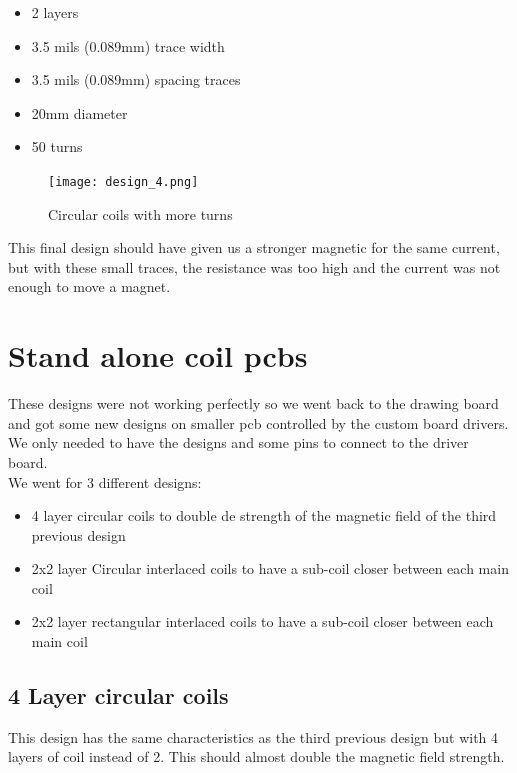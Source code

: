 \begin{itemize}
	\item 2 layers
	\item 3.5 mils (0.089mm) trace width
	\item 3.5 mils (0.089mm) spacing traces
	\item 20mm diameter
	\item 50 turns
\end{itemize}

\begin{figure}[H]
	\centering
	\texttt{[image: design\_4.png]}
	\caption[Circular coils with more turns]{Circular coils with more turns}
	\label{fig:circular_more_turns}
\end{figure}

This final design should have given us a stronger magnetic for the same current, but with these small traces, the resistance was too high and the current was not enough to move a magnet.

\newpage


\section{Stand alone coil \gls{pcb}s}

These designs were not working perfectly so we went back to the drawing board and got some new designs on smaller \gls{pcb} controlled by the custom board drivers. We only needed to have the designs and some pins to connect to the driver board.
\\

We went for 3 different designs:
\begin{itemize}
	\item 4 layer circular coils to double de strength of the magnetic field of the third previous design
	\item 2x2 layer Circular interlaced coils to have a sub-coil closer between each main coil
	\item 2x2 layer rectangular interlaced coils to have a sub-coil closer between each main coil
\end{itemize}

\subsection{4 Layer circular coils}

This design has the same characteristics as the third previous design but with 4 layers of coil instead of 2. This should almost double the magnetic field strength.

